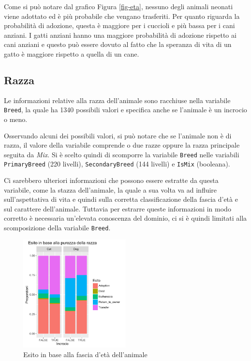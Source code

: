 Come si può notare dal grafico Figura \ref{fig-eta}, nessuno degli animali neonati viene adottato ed è più probabile che vengano trasferiti. Per quanto riguarda la probabilità di adozione, questa è maggiore per i cuccioli e più bassa per i cani anziani. I gatti anziani hanno una maggiore probabilità di adozione rispetto ai cani anziani e questo può essere dovuto al fatto che la speranza di vita di un gatto è maggiore rispetto a quella di un cane.

\subsection{Razza}

Le informazioni relative alla razza dell'animale sono racchiuse nella variabile \texttt{Breed}, la quale ha 1340 possibili valori e specifica anche se l'animale è un incrocio o meno.

Osservando alcuni dei possibili valori, si può notare che se l'animale non è di razza, il valore della variabile comprende o due razze oppure la razza principale seguita da \textit{Mix}. Si è scelto quindi di scomporre la variabile \texttt{Breed} nelle variabili \texttt{PrimaryBreed} (220 livelli), \texttt{SecondaryBreed} (144 livelli) e \texttt{IsMix} (booleana).

Ci sarebbero ulteriori informazioni che possono essere estratte da questa variabile, come la stazza dell'animale, la quale a sua volta va ad influire sull'aspettativa di vita e quindi sulla corretta classificazione della fascia d'età e sul carattere dell'animale. Tuttavia per estrarre queste informazioni in modo corretto è necessaria un'elevata conoscenza del dominio, ci si è quindi limitati alla scomposizione della variabile \texttt{Breed}.

\begin{figure}[htbp]
	\centering
	\includegraphics[width=0.5\textwidth]{./grafici/esito_mix.pdf}
	\caption{Esito in base alla fascia d'età dell'animale}\label{fig-mix}
\end{figure}


